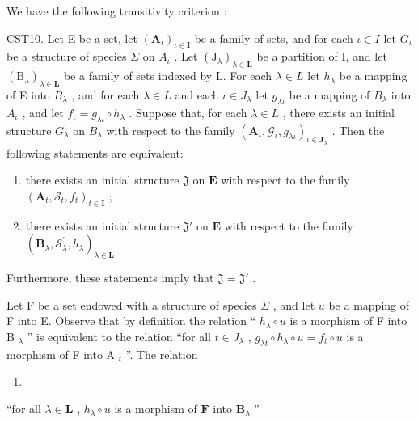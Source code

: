 We have the following transitivity criterion :

CST10. Let E be a set, let \((\mathbf{A}_{\iota})_{\iota\in\mathbf{I}}\) be a family of sets, and for each \(\iota\in I\) let \(G_{\iota}\) be a structure of species \(\Sigma\) on \(A_{\iota}\) . Let \((\mathrm{J}_{\lambda})_{\lambda\in\mathbf{L}}\) be a partition of I, and let \((\mathrm{B}_{\lambda})_{\lambda\in\mathbf{L}}\) be a family of sets indexed by L. For each \(\lambda\in L\) let \(h_{\lambda}\) be a mapping of E into \(B_{\lambda}\) , and for each \(\lambda\in L\) and each \(\iota\in J_{\lambda}\) let \(g_{\lambda\iota}\) be a mapping of \(B_{\lambda}\) into \(A_{\iota}\) , and let \(f_{\iota}=g_{\lambda\iota}\circ h_{\lambda}\) . Suppose that, for each \(\lambda\in L\) , there exists an initial structure \(G_{\lambda}^{\prime}\) on \(B_{\lambda}\) with respect to the family \((\mathbf{A}_{\iota},\mathcal{G}_{\iota},g_{\lambda\iota})_{\iota\in\mathbf{J}_{\lambda}}\) . Then the following statements are equivalent:

\begin{enumerate}
\def\labelenumi{(\alph{enumi})}
\item
  there exists an initial structure \(\mathfrak{J}\) on \(\mathbf{E}\) with respect to the family \((\mathbf{A}_t, \mathcal{S}_t, f_t)_{t \in \mathbf{I}}\) ;
\item
  there exists an initial structure \(\mathfrak{J}'\) on \(\mathbf{E}\) with respect to the family \((\mathbf{B}_{\lambda},\mathcal{S}_{\lambda}^{\prime},h_{\lambda})_{\lambda \in \mathbf{L}}\) .
\end{enumerate}

Furthermore, these statements imply that \(\mathfrak{J} = \mathfrak{J}'\) .

Let F be a set endowed with a structure of species \(\Sigma\) , and let \(u\) be a mapping of F into E. Observe that by definition the relation `` \(h_{\lambda} \circ u\) is a morphism of F into B \(_{\lambda}\) '' is equivalent to the relation ``for all \(t \in J_{\lambda}\) , \(g_{\lambda t} \circ h_{\lambda} \circ u = f_{t} \circ u\) is a morphism of F into A \(_{t}\) ''. The relation

\begin{enumerate}
\def\labelenumi{(\arabic{enumi})}
\tightlist
\item
\end{enumerate}

``for all \(\lambda \in \mathbf{L}\) , \(h_{\lambda} \circ u\) is a morphism of \(\mathbf{F}\) into \(\mathbf{B}_{\lambda}\) ''

